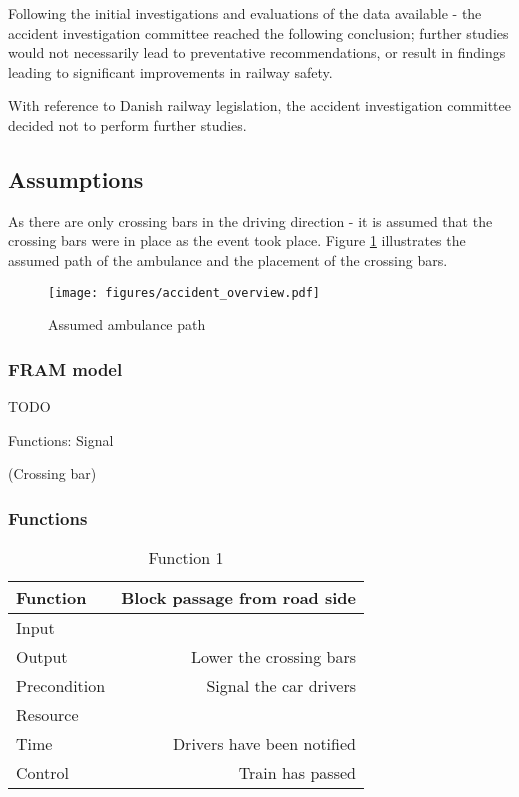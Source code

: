 Following the initial investigations and evaluations of the data available - the accident investigation committee reached the following conclusion; further studies would not necessarily lead to preventative recommendations, or result in findings leading to significant improvements in railway safety.

With reference to Danish railway legislation, the accident investigation committee decided not to perform further studies. 

\subsection{Assumptions}
As there are only crossing bars in the driving direction - it is assumed that the crossing bars were in place as the event took place. Figure \ref{fig:ambulance_path} illustrates the assumed path of the ambulance and the placement of the crossing bars.
\begin{figure}
 \centering
   \texttt{[image: figures/accident\_overview.pdf]}
 \caption{Assumed ambulance path}
 \label{fig:ambulance_path}
\end{figure}

\subsubsection{FRAM model}
TODO

Functions: 
Signal

(Crossing bar)


\subsubsection{Functions}
\begin{table}[h]
\centering
    \begin{tabular}{ | l | r | }
    \hline
    Function     &  Block passage from road side\\ \hline \hline
    Input        &  \\ \hline
    Output       &  Lower the crossing bars\\ \hline
    Precondition &  Signal the car drivers\\ \hline
    Resource     &  \\ \hline
    Time         &  Drivers have been notified\\ \hline
    Control      &  Train has passed\\ \hline
    \end{tabular}
\caption{Function 1}
\label{table:function}
\end{table}

